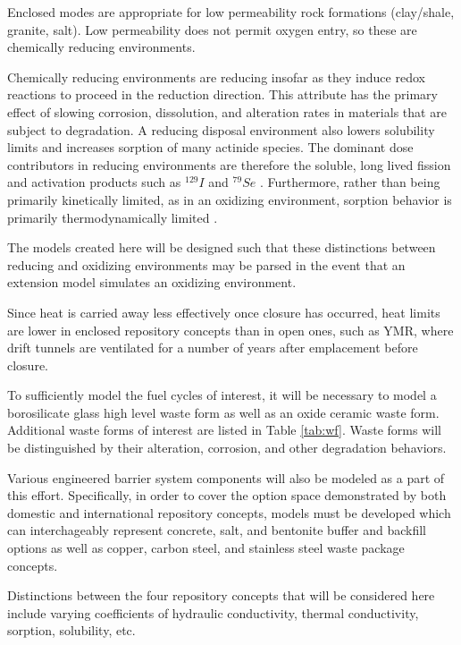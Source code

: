 Enclosed modes are appropriate for low permeability rock formations (clay/shale, 
granite, salt).  Low permeability does not permit oxygen entry, so these are
chemically reducing environments.  

Chemically reducing environments are reducing insofar as they induce redox 
reactions to proceed in the reduction direction. This attribute has the primary 
effect of slowing corrosion, dissolution, and  alteration rates in materials 
that are subject to degradation. A reducing disposal environment also lowers 
solubility limits and increases sorption of many actinide species. The dominant 
dose contributors in reducing environments are therefore the soluble, long 
lived fission and activation products such as $^{129}I$ and $^{79}Se$ 
\cite{oecd-nea_advanced_2006, von_lensa_red-impact_2008}.  Furthermore, rather 
than being primarily kinetically limited, as in an oxidizing environment, 
sorption behavior is primarily thermodynamically limited 
\cite{nutt_personal_2011, schwartz_fundamentals_2004}. 

The models created here will be designed such that these distinctions between 
reducing and oxidizing environments may be parsed in the event that an 
extension model simulates an oxidizing environment. 

Since heat is carried away less effectively once closure 
has occurred, heat limits are lower in enclosed repository concepts than in open 
ones, such as \gls{YMR}, where drift tunnels are ventilated for a number of years
after emplacement before closure.

To sufficiently model the fuel cycles of interest, it will be necessary to model 
a borosilicate glass high level waste form as well as an oxide ceramic waste 
form. Additional waste forms 
of interest are listed in Table \ref{tab:wf}. Waste forms will be 
distinguished by their alteration, corrosion, and other degradation behaviors.

Various engineered barrier system components will also be modeled as a part of 
this effort.  Specifically, in order to cover the option space demonstrated by 
both domestic and international repository concepts, models must be developed 
which can interchageably represent concrete, salt, and bentonite buffer and 
backfill options as well as copper, carbon steel, and stainless steel waste 
package concepts.  

Distinctions between the four repository concepts that will be considered here 
include varying coefficients of hydraulic conductivity, thermal conductivity, 
sorption, solubility, etc.

